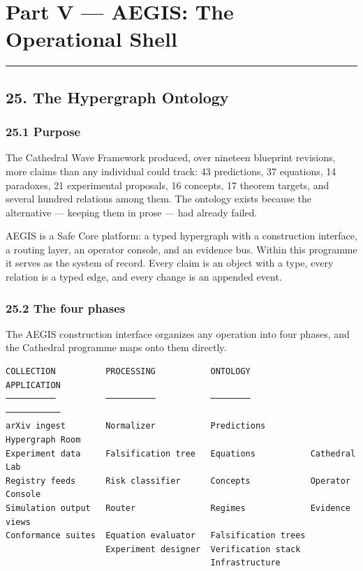 \documentclass[
  11pt]{report}
\begin{document}
\hypertarget{part-v-aegis-the-operational-shell}{%
\part{Part V --- AEGIS: The Operational
Shell}\label{part-v-aegis-the-operational-shell}}

\begin{center}\rule{0.5\linewidth}{0.5pt}\end{center}

\hypertarget{the-hypergraph-ontology}{%
\chapter{25. The Hypergraph Ontology}\label{the-hypergraph-ontology}}

\hypertarget{purpose}{%
\section{25.1 Purpose}\label{purpose}}

The Cathedral Wave Framework produced, over nineteen blueprint
revisions, more claims than any individual could track: 43 predictions,
37 equations, 14 paradoxes, 21 experimental proposals, 16 concepts, 17
theorem targets, and several hundred relations among them. The ontology
exists because the alternative --- keeping them in prose --- had already
failed.

AEGIS is a Safe Core platform: a typed hypergraph with a construction
interface, a routing layer, an operator console, and an evidence bus.
Within this programme it serves as the system of record. Every claim is
an object with a type, every relation is a typed edge, and every change
is an appended event.

\hypertarget{the-four-phases}{%
\section{25.2 The four phases}\label{the-four-phases}}

The AEGIS construction interface organizes any operation into four
phases, and the Cathedral programme maps onto them directly.

\begin{verbatim}
COLLECTION          PROCESSING           ONTOLOGY            APPLICATION
──────────          ──────────           ────────            ───────────
arXiv ingest        Normalizer           Predictions         Hypergraph Room
Experiment data     Falsification tree   Equations           Cathedral Lab
Registry feeds      Risk classifier      Concepts            Operator Console
Simulation output   Router               Regimes             Evidence views
Conformance suites  Equation evaluator   Falsification trees
                    Experiment designer  Verification stack
                                         Infrastructure
\end{verbatim}
\end{document}
